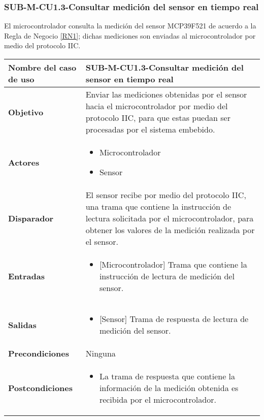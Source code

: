 \subsubsection{SUB-M-CU1.3-Consultar medición del sensor en tiempo real}\label{SUB-M-CU1.3}
El microcontrolador consulta la medición del sensor MCP39F521 de acuerdo a la Regla de Negocio \ref{RN1}; dichas mediciones son enviadas al microcontrolador por medio del protocolo IIC.
\begin{longtable}{|J{5cm}|J{10.3cm}|}
	\hline
	\textbf{Nombre del caso de uso} &
		SUB-M-CU1.3-Consultar medición del sensor en tiempo real \\ \hline
	\textbf{Objetivo} &
		Enviar las mediciones obtenidas por el sensor hacia el microcontrolador por medio del protocolo IIC, para que estas puedan ser procesadas por el sistema embebido. \\ \hline
	\textbf{Actores} &
	    \begin{itemize}
		    \item Microcontrolador
		    \item Sensor
		\end{itemize}\\ \hline 
	\textbf{Disparador} & 
		El sensor recibe por medio del protocolo IIC, una trama que contiene la instrucción de lectura solicitada por el microcontrolador, para obtener los valores de la medición realizada por el sensor. \\ \hline 
	\textbf{Entradas} & 
		\begin{itemize}
				\item {[Microcontrolador]} Trama que contiene la instrucción de lectura de medición del sensor.
		\end{itemize}\\ \hline 
	\textbf{Salidas} & 
	    \begin{itemize}
	        \item {[Sensor]} Trama de respuesta de lectura de medición del sensor.
	    \end{itemize}\\ \hline
	\textbf{Precondiciones} & 
		Ninguna \\ \hline
	\textbf{Postcondiciones} &
		\begin{itemize}
			\item La trama de respuesta que contiene la información de la medición obtenida es recibida por el microcontrolador.

\end{itemize}
\end{longtable}
